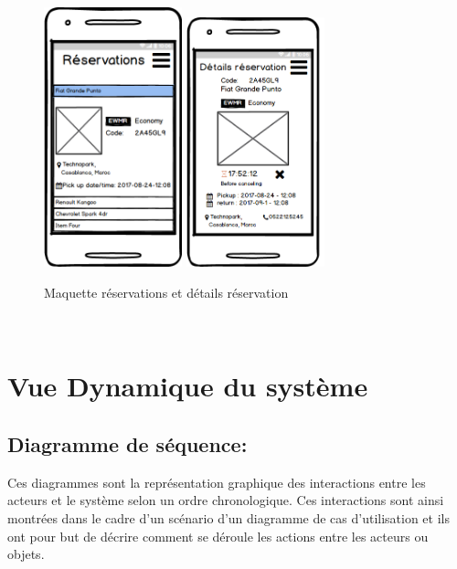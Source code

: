 \documentclass[12pt,a4paper]{report}
\begin{document}
			\begin{figure}
			\includegraphics[width=4cm]{./graphics/mk3.png}\hfill
			\includegraphics[width=4cm]{./graphics/mk6.png}
			\caption{Maquette réservations et détails réservation}
			\end{figure}
			
			

		\newpage
		~
		\newpage
		\section{Vue Dynamique du système}
			\subsection{Diagramme de séquence:} 
Ces diagrammes sont la représentation graphique des interactions entre les acteurs et le
système selon un ordre chronologique. Ces interactions sont ainsi montrées dans le cadre d'un
scénario d'un diagramme de cas d'utilisation et ils ont pour but de décrire comment se déroule les
actions entre les acteurs ou objets.
			
\end{document}
